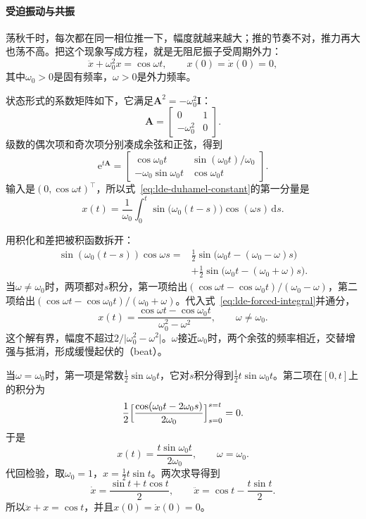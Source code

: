 \paragraph{受迫振动与共振}
荡秋千时，每次都在同一相位推一下，幅度就越来越大；推的节奏不对，推力再大也荡不高。把这个现象写成方程，就是无阻尼振子受周期外力：
\begin{equation}
 \ddot{x}+\omega_0^2x=\cos\omega t,\qquad x(0)=\dot{x}(0)=0,
 \label{eq:lde-forced-oscillator}
\end{equation}
其中$\omega_0>0$是固有频率，$\omega>0$是外力频率。

状态形式的系数矩阵如下，它满足$\bm{A}^2=-\omega_0^2\bm{I}$：
\[
 \bm{A}=\begin{bmatrix}0&1\\-\omega_0^2&0\end{bmatrix}.
\]
级数的偶次项和奇次项分别凑成余弦和正弦，得到
\[
 \mathrm{e}^{t\bm{A}}=\begin{bmatrix}\cos\omega_0t&\sin(\omega_0t)/\omega_0\\-\omega_0\sin\omega_0t&\cos\omega_0t\end{bmatrix}.
\]
输入是$(0,\cos\omega t)^{\top}$，所以式~\eqref{eq:lde-duhamel-constant}的第一分量是
\begin{equation}
 x(t)=\frac{1}{\omega_0}\int_0^t\sin\bigl(\omega_0(t-s)\bigr)\cos(\omega s)\,\mathrm{d}s.
 \label{eq:lde-forced-integral}
\end{equation}

用积化和差把被积函数拆开：
\[
 \begin{aligned}
 \sin(\omega_0(t-s))\cos\omega s={}&\tfrac12\sin\bigl(\omega_0t-(\omega_0-\omega)s\bigr)\\
 &+\tfrac12\sin\bigl(\omega_0t-(\omega_0+\omega)s\bigr).
 \end{aligned}
\]
当$\omega\neq\omega_0$时，两项都对$s$积分，第一项给出$(\cos\omega t-\cos\omega_0t)/(\omega_0-\omega)$，第二项给出$(\cos\omega t-\cos\omega_0t)/(\omega_0+\omega)$。代入式~\eqref{eq:lde-forced-integral}并通分，
\begin{equation}
 x(t)=\frac{\cos\omega t-\cos\omega_0t}{\omega_0^2-\omega^2},\qquad \omega\neq\omega_0.
 \label{eq:lde-off-resonance}
\end{equation}
这个解有界，幅度不超过$2/\lvert\omega_0^2-\omega^2\rvert$。$\omega$接近$\omega_0$时，两个余弦的频率相近，交替增强与抵消，形成缓慢起伏的（beat）。

当$\omega=\omega_0$时，第一项是常数$\tfrac12\sin\omega_0t$，它对$s$积分得到$\tfrac12t\sin\omega_0t$。第二项在$[0,t]$上的积分为
\[
 \frac12\Bigl[\frac{\cos(\omega_0t-2\omega_0s)}{2\omega_0}\Bigr]_{s=0}^{s=t}=0.
\]
于是
\begin{equation}
 x(t)=\frac{t\sin\omega_0t}{2\omega_0},\qquad \omega=\omega_0.
 \label{eq:lde-resonance}
\end{equation}
代回检验，取$\omega_0=1$，$x=\tfrac12t\sin t$。两次求导得到
\[
 \dot{x}=\frac{\sin t+t\cos t}{2},\qquad \ddot{x}=\cos t-\frac{t\sin t}{2}.
\]
所以$\ddot{x}+x=\cos t$，并且$x(0)=\dot{x}(0)=0$。

